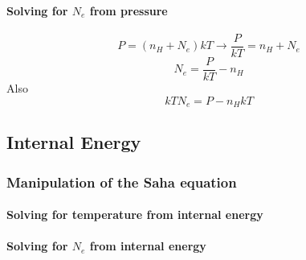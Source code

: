 \documentclass{article}
\begin{document}
				\paragraph{Solving for $N_e$ from pressure}
					\begin{equation*}
						P = (n_H + N_e) k T \rightarrow
						\frac{P}{kT} = n_H + N_e
					\end{equation*}
					\begin{equation}
						N_e =  \frac{P}{kT} - n_H
					\end{equation}
					Also
					\begin{equation}
						k T N_e =  P - n_H k T
					\end{equation}

		\subsection{Internal Energy} 
			\subsubsection{Manipulation of the Saha equation}
				\paragraph{Solving for temperature from internal energy}

				\paragraph{Solving for $N_e$ from internal energy}


		
\end{document}
